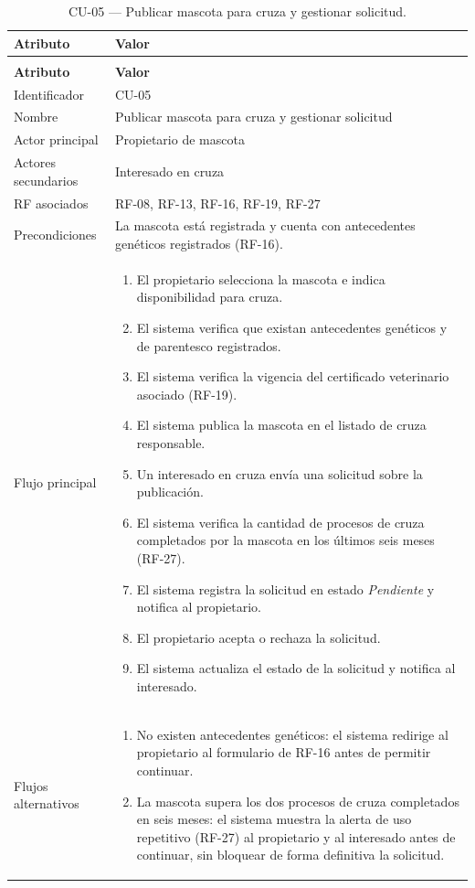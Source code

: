 \documentclass[journal,onecolumn]{IEEEtran}
\makeatletter
\newenvironment{atributos}[2]{%
	\small
	\begin{longtable}{@{}>{\raggedright\arraybackslash}p{4.2cm} >{\raggedright\arraybackslash}p{11.2cm}@{}}
		\caption{#2}\label{tab:#1}\\
		\toprule
		\textbf{Atributo} & \textbf{Valor} \\
		\midrule
		\endfirsthead
		\multicolumn{2}{@{}l}{\small\itshape (continuación)}\\
		\toprule
		\textbf{Atributo} & \textbf{Valor} \\
		\midrule
		\endhead
		\bottomrule
		\endlastfoot
	}{%
	\end{longtable}
	\normalsize
}
\makeatother
\begin{document}
	\begin{atributos}{CU-05}{CU-05 --- Publicar mascota para cruza y gestionar solicitud.}
		Identificador & CU-05 \\
		Nombre & Publicar mascota para cruza y gestionar solicitud \\
		Actor principal & Propietario de mascota \\
		Actores secundarios & Interesado en cruza \\
		RF asociados & RF-08, RF-13, RF-16, RF-19, RF-27 \\
		Precondiciones & La mascota está registrada y cuenta con antecedentes genéticos registrados (RF-16). \\
		Flujo principal &
		\begin{enumerate}[leftmargin=*, nosep]
			\item El propietario selecciona la mascota e indica disponibilidad para cruza.
			\item El sistema verifica que existan antecedentes genéticos y de parentesco registrados.
			\item El sistema verifica la vigencia del certificado veterinario asociado (RF-19).
			\item El sistema publica la mascota en el listado de cruza responsable.
			\item Un interesado en cruza envía una solicitud sobre la publicación.
			\item El sistema verifica la cantidad de procesos de cruza completados por la mascota en los últimos seis meses (RF-27).
			\item El sistema registra la solicitud en estado \emph{Pendiente} y notifica al propietario.
			\item El propietario acepta o rechaza la solicitud.
			\item El sistema actualiza el estado de la solicitud y notifica al interesado.
		\end{enumerate} \\
		Flujos alternativos &
		\begin{enumerate}[leftmargin=*, nosep]
			\item[2.1] No existen antecedentes genéticos: el sistema redirige al propietario al formulario de RF-16 antes de permitir continuar.
			\item[6.1] La mascota supera los dos procesos de cruza completados en seis meses: el sistema muestra la alerta de uso repetitivo (RF-27) al propietario y al interesado antes de continuar, sin bloquear de forma definitiva la solicitud.

\end{enumerate}
\end{atributos}
\end{document}
